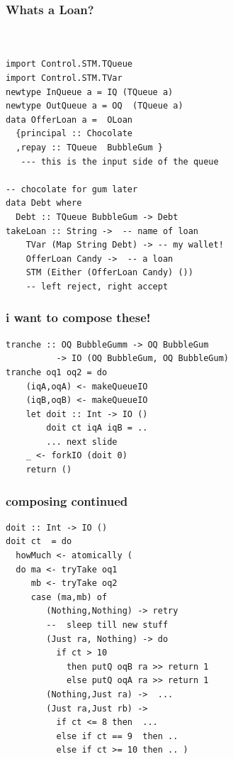 \documentclass[11pt,reqno]{beamer}
\begin{document}






\begin{frame}[fragile]
\frametitle{Whats a Loan?}
\begin{verbatim}


import Control.STM.TQueue
import Control.STM.TVar
newtype InQueue a = IQ (TQueue a)
newtype OutQueue a = OQ  (TQueue a)
data OfferLoan a =  OLoan
  {principal :: Chocolate
  ,repay :: TQueue  BubbleGum }
   --- this is the input side of the queue

-- chocolate for gum later
data Debt where
  Debt :: TQueue BubbleGum -> Debt
takeLoan :: String ->  -- name of loan
    TVar (Map String Debt) -> -- my wallet!
    OfferLoan Candy ->  -- a loan
    STM (Either (OfferLoan Candy) ())
    -- left reject, right accept
\end{verbatim}
\end{frame}




\begin{frame}[fragile]\frametitle{i want to compose these!}
\begin{verbatim}
tranche :: OQ BubbleGumm -> OQ BubbleGum
          -> IO (OQ BubbleGum, OQ BubbleGum)
tranche oq1 oq2 = do
    (iqA,oqA) <- makeQueueIO
    (iqB,oqB) <- makeQueueIO
    let doit :: Int -> IO ()
        doit ct iqA iqB = ..
        ... next slide
    _ <- forkIO (doit 0)
    return ()
\end{verbatim}
\end{frame}

\begin{frame}[fragile]\frametitle{composing continued}
    \begin{verbatim}
doit :: Int -> IO ()
doit ct  = do
  howMuch <- atomically (
  do ma <- tryTake oq1
     mb <- tryTake oq2
     case (ma,mb) of
        (Nothing,Nothing) -> retry
        --  sleep till new stuff
        (Just ra, Nothing) -> do
          if ct > 10
            then putQ oqB ra >> return 1
            else putQ oqA ra >> return 1
        (Nothing,Just ra) ->  ...
        (Just ra,Just rb) ->
          if ct <= 8 then  ...
          else if ct == 9  then ..
          else if ct >= 10 then .. )

    \end{verbatim}


\end{frame}
\end{document}
